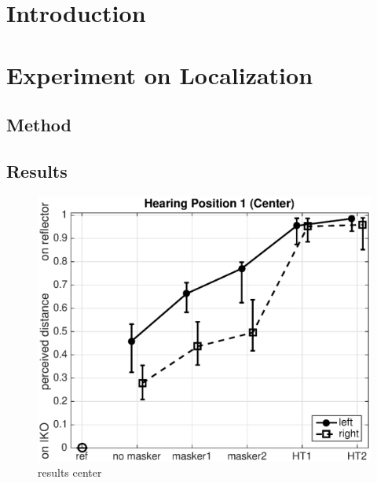 \documentclass[a4paper, 10pt, twocolumn]{article}
\begin{document}
\section*{Introduction}
\label{sec:Introduction} 

\section*{Experiment on Localization}
\label{sec:Experiment on Localization} 

\subsection*{Method}
\label{sec:Method}


\subsection*{Results}
\label{sec:Results}

\begin{figure}[ht]
	\centering
	\includegraphics[scale=0.5]{./figures/center.eps}
	\caption{results center}
\end{figure}
\end{document}
